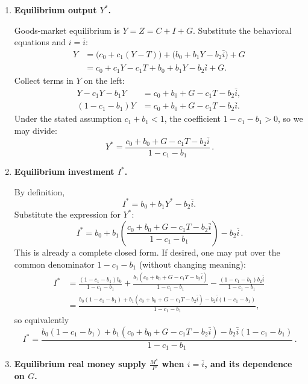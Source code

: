 \documentclass[12pt]{article}
\begin{document}
\begin{enumerate}[label=(\alph*)]
\item \textbf{Equilibrium output \(Y^*\).}

Goods-market equilibrium is \(Y=Z=C+I+G\). Substitute the behavioral equations and \(i=\bar{i}\):
\begin{align*}
Y &= \bigl(c_0+c_1(Y-T)\bigr) + \bigl(b_0+b_1Y-b_2\bar{i}\bigr) + G \\
  &= c_0 + c_1Y - c_1T + b_0 + b_1Y - b_2\bar{i} + G.
\end{align*}
Collect terms in \(Y\) on the left:
\begin{align*}
Y - c_1Y - b_1Y &= c_0 + b_0 + G - c_1T - b_2\bar{i},\\
(1-c_1-b_1)Y &= c_0 + b_0 + G - c_1T - b_2\bar{i}.
\end{align*}
Under the stated assumption \(c_1+b_1<1\), the coefficient \(1-c_1-b_1>0\), so we may divide:
\[
\boxed{\,
Y^*=\dfrac{c_0 + b_0 + G - c_1T - b_2\bar{i}}{1-c_1-b_1}
\, }.
\]

\item \textbf{Equilibrium investment \(I^*\).}

By definition,
\[
I^* = b_0 + b_1Y^* - b_2\bar{i}.
\]
Substitute the expression for \(Y^*\):
\[
\boxed{\,
I^* = b_0 + b_1\left(\dfrac{c_0 + b_0 + G - c_1T - b_2\bar{i}}{1-c_1-b_1}\right) - b_2\bar{i}
\, }.
\]
This is already a complete closed form. If desired, one may put over the common denominator \(1-c_1-b_1\) (without changing meaning):
\begin{align*}
I^*
&= \frac{(1-c_1-b_1)b_0}{1-c_1-b_1}
 + \frac{b_1(c_0+b_0+G-c_1T-b_2\bar{i})}{1-c_1-b_1}
 - \frac{(1-c_1-b_1)b_2\bar{i}}{1-c_1-b_1} \\
&= \frac{b_0(1-c_1-b_1) + b_1(c_0+b_0+G-c_1T-b_2\bar{i}) - b_2\bar{i}(1-c_1-b_1)}{1-c_1-b_1},
\end{align*}
so equivalently
\[
\boxed{\,
I^*=\dfrac{b_0(1-c_1-b_1) + b_1(c_0+b_0+G-c_1T-b_2\bar{i}) - b_2\bar{i}(1-c_1-b_1)}{1-c_1-b_1}
\, }.
\]

\item \textbf{Equilibrium real money supply \(\frac{M^s}{P}\) when \(i=\bar{i}\), and its dependence on \(G\).}


\end{enumerate}
\end{document}

